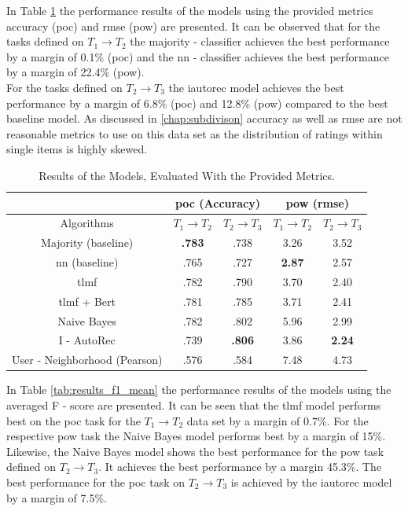 \noindent In Table \ref{tab:results} the performance results of the models using the provided metrics accuracy (\acrshort{poc}) and \acrshort{rmse} (\acrshort{pow}) are presented. It can be observed that for the tasks defined on $T_1 \to T_2$ the majority - classifier achieves the best performance by a margin of 0.1\% (\acrshort{poc}) and the \acrfull{nn} - classifier achieves the best performance by a margin of 22.4\% (\acrshort{pow}).\\ For the tasks defined on $T_2 \to T_3$ the \acrshort{iautorec} model achieves the best performance by a margin of 6.8\% (\acrshort{poc}) and 12.8\% (\acrshort{pow}) compared to the best baseline model. As discussed in \ref{chap:subdivison} accuracy as well as \acrshort{rmse} are not reasonable metrics to use on this data set as the distribution of ratings within single items is highly skewed.

\begin{table}[h!]
    \centering
    \begin{tabular}{|c|c|c|c|c|}
    \hline
     & \multicolumn{2}{|c|}{\acrshort{poc} (Accuracy)} & \multicolumn{2}{|c|}{\acrshort{pow} (\acrshort{rmse})} \\
     \hline
    Algorithms & $T_1 \to T_2$ & $T_2 \to T_3$ & $T_1 \to T_2$ & $T_2 \to T_3$\\
    \hline  Majority (baseline) & \textbf{.783} & .738 & 3.26 & 3.52 \\
    \acrshort{nn} (baseline) & .765 & .727 & \textbf{2.87} & 2.57\\
    \acrshort{tlmf} & .782 & .790 & 3.70 & 2.40 \\
    \acrshort{tlmf} + Bert & .781 & .785 & 3.71 & 2.41\\
    Naive Bayes & .782 & .802 & 5.96 & 2.99 \\
    I - AutoRec & .739 & \textbf{.806} & 3.86 & \textbf{2.24}\\
    User - Neighborhood (Pearson) & .576 & .584 & 7.48 & 4.73\\
    \hline
    \end{tabular}
    \caption{Results of the Models, Evaluated With the Provided Metrics.}
    \label{tab:results}
\end{table}
\noindent In Table \ref{tab:results_f1_mean} the performance results of the models using the averaged F - score are presented. It can be seen that the \acrshort{tlmf} model performs best on the \acrshort{poc} task for the $T_1 \to T_2$ data set by a margin of 0.7\%. For the respective \acrshort{pow} task the Naive Bayes model performs best by a margin of 15\%. \\
Likewise, the Naive Bayes model shows the best performance for the \acrshort{pow} task defined on $T_2 \to T_3$. It achieves the best performance by a margin 45.3\%. The best performance for the \acrshort{poc} task on $T_2 \to T_3$ is achieved by the \acrshort{iautorec} model by a margin of 7.5\%.

